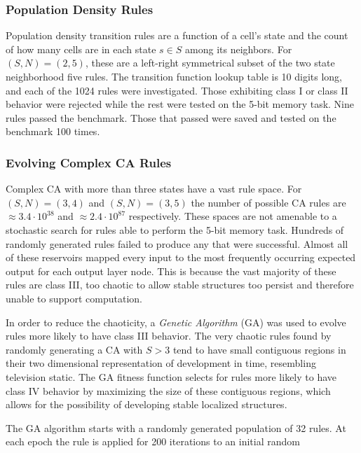 \documentclass{elsarticle}
\begin{document}
\begin{multicols}{2}
\subsubsection{Population Density Rules}
Population density transition rules are a function of a cell's state and the 
    count of how many cells are in each state $s \in S$ among its neighbors.  
    For $(S,N) = (2,5)$, these are a left-right symmetrical subset of the two 
    state neighborhood five rules. The transition function lookup table is 10 
    digits long, and each of the 1024 rules were investigated. Those exhibiting 
    class I or class II behavior were rejected while the rest were tested on 
    the 5-bit memory task. Nine rules passed the benchmark. Those that passed 
    were saved and tested on the benchmark 100 times.

  \subsubsection{Evolving Complex CA Rules}
Complex CA with more than three states have a vast rule space. For $(S,N) = 
   (3,4)$ and $(S,N) = (3,5)$ the number of possible CA rules are $\approx 3.4 
   \cdot 10^{38}$ and $\approx 2.4 \cdot 10^{87}$ respectively. These spaces 
   are not amenable to a stochastic search for rules able to perform the 5-bit 
   memory task.  Hundreds of randomly generated rules failed to produce any 
   that were successful. Almost all of these reservoirs mapped every input to 
   the most frequently occurring expected output for each output layer node.  
   This is because the vast majority of these rules are class III, too chaotic 
   to allow stable structures too persist and therefore unable to support 
   computation.\par
In order to reduce the chaoticity, a \textit{Genetic Algorithm} (GA) was used 
to evolve rules more likely to have class III behavior. The very chaotic rules 
found by randomly generating a CA with $S > 3$ tend to have small contiguous 
regions in their two dimensional representation of development in time, 
        resembling television static.  The GA fitness function selects for 
           rules more likely to have class IV behavior by maximizing the size 
           of these contiguous regions, which allows for the possibility of 
           developing stable localized structures. \par The GA algorithm starts 
           with a randomly generated population of 32 rules. At each epoch the 
           rule is applied for 200 iterations to an initial random 

\end{multicols}
\end{document}
